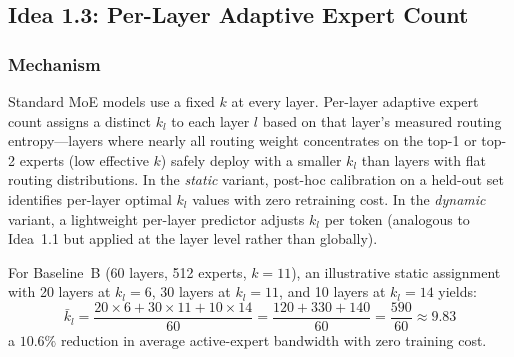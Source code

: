 \documentclass[11pt]{article}
\begin{document}
\subsection{Idea 1.3: Per-Layer Adaptive Expert Count}
\label{subsec:idea-1-3}

\subsubsection*{Mechanism}
Standard MoE models use a fixed $k$ at every layer.
Per-layer adaptive expert count assigns a distinct $k_l$ to each layer $l$ based on that layer's measured routing entropy---layers where nearly all routing weight concentrates on the top-1 or top-2 experts (low effective $k$) safely deploy with a smaller $k_l$ than layers with flat routing distributions.
In the \emph{static} variant, post-hoc calibration on a held-out set identifies per-layer optimal $k_l$ values with zero retraining cost.
In the \emph{dynamic} variant, a lightweight per-layer predictor adjusts $k_l$ per token (analogous to Idea~1.1 but applied at the layer level rather than globally).

For Baseline~B (60 layers, 512 experts, $k=11$), an illustrative static assignment with 20 layers at $k_l=6$, 30 layers at $k_l=11$, and 10 layers at $k_l=14$ yields:
\[
  \bar{k}_l = \frac{20 \times 6 + 30 \times 11 + 10 \times 14}{60} = \frac{120 + 330 + 140}{60} = \frac{590}{60} \approx 9.83
\]
a $10.6\%$ reduction in average active-expert bandwidth with zero training cost.
\end{document}
